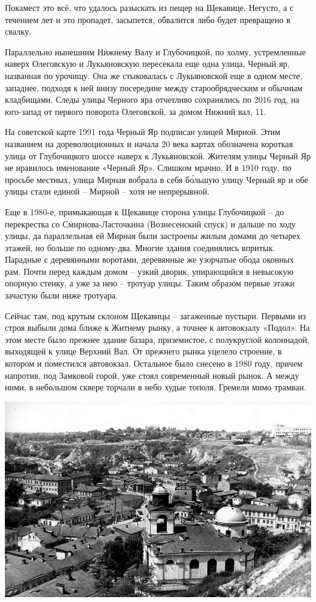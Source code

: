 Покамест это всё, что удалось разыскать из пещер на Щекавице. Негусто, а с течением лет и это пропадет, засыпется, обвалится либо будет превращено в свалку. 

Параллельно нынешним Нижнему Валу и Глубочицкой, по холму, устремленные наверх Олеговскую и Лукьяновскую пересекала еще одна улица, Черный яр, названная по урочищу. Она же стыковалась с Лукьяновской еще в одном месте, западнее, подходя к ней внизу посередине между старообрядческим и обычным кладбищами. Следы улицы Черного яра отчетливо сохранялись по 2016 год, на юго-запад от первого поворота Олеговской, за домом Нижний вал, 11. 

На советской карте 1991 года Черный Яр подписан улицей Мирной. Этим названием на дореволюционных и начала 20 века картах обозначена короткая улица от Глубочицкого шоссе наверх к Лукьяновской. Жителям улицы Черный Яр не нравилось именование «Черный Яр». Слишком мрачно. И в 1910 году, по просьбе местных, улица Мирная вобрала в себя б\'ольшую улицу Черный яр и обе улицы стали единой – Мирной – хотя не непрерывной.

Еще в 1980-е, примыкающая к Щекавице сторона улицы Глубочицкой – до перекрестка со Смирнова-Ласточ\-кина (Вознесенский спуск) и дальше по ходу улицы, да параллельная ей Мирная были застроены жилым домами до четырех этажей, но больше по одному-два. Многие здания соединялись впритык. Парадные с деревянными воротами, деревянные же узорчатые обода оконных рам. Почти перед каждым домом – узкий дворик, упирающийся в невысокую опорную стенку, а уже за нею – тротуар улицы. Таким образом первые этажи зачастую были ниже тротуара.

Сейчас там, под крутым склоном Щекавицы – загаженные пустыри. Первыми из строя выбыли дома ближе к Житнему рынку, а точнее к автовокзалу «Подол». На этом месте было прежнее здание базара, приземистое, с полукруглой колоннадой, выходящей к улице Верхний Вал. От прежнего рынка уцелело строение, в котором и поместился автовокзал. Остальное было снесено в 1980 году, причем напротив, под Замковой горой, уже стоял современный новый рынок. А между ними, в небольшом сквере торчали в небо худые тополя. Гремели мимо трамваи.

\begin{center}
\includegraphics[width=0.95\linewidth]{chast-colebanie-osnov/sheka/0421_KK.jpg}
\end{center}

